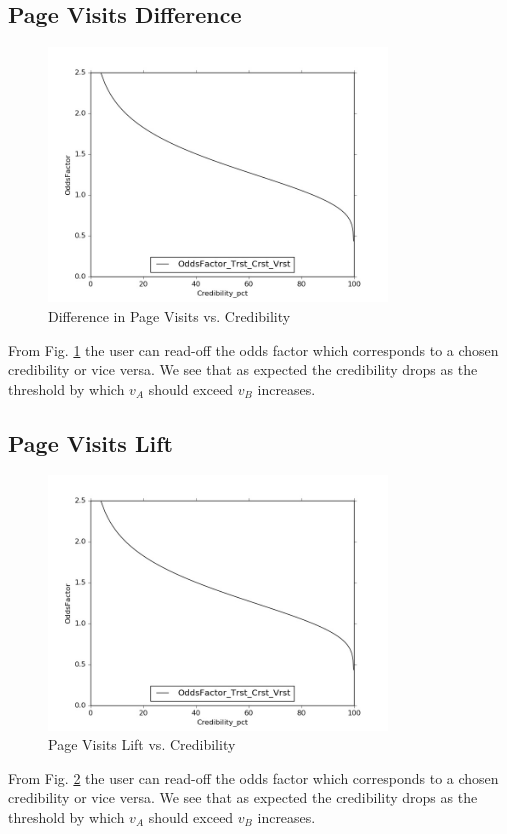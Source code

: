 \documentclass[12pt]{report}
\begin{document}
\subsection{Page Visits Difference\label{sec:visits-diff-result}}
\begin{figure}[ht!]
\centering
\includegraphics[width=90mm]{figures/OddsFactor_Trst_Crst_Vrst}
\caption{Difference in Page Visits vs. Credibility \label{fig:visitsdiff-vs-cred}}
\end{figure}
From  Fig.
\ref{fig:visitsdiff-vs-cred} the user can read-off the odds factor which
corresponds to a chosen credibility or vice versa. We see
that as expected the credibility drops as the
threshold by which \(v_A\) should exceed \(v_B\) increases.

\subsection{Page Visits Lift\label{sec:visits-lift-result}}
\begin{figure}[ht!]
\centering
\includegraphics[width=90mm]{figures/OddsFactor_Trst_Crst_Vrst}
\caption{Page Visits Lift vs. Credibility \label{fig:visitslift-vs-cred}}
\end{figure}
From  Fig.
\ref{fig:visitslift-vs-cred} the user can read-off the odds factor which
corresponds to a chosen credibility or vice versa. We see
that as expected the credibility drops as the
threshold by which \(v_A\) should exceed \(v_B\) increases.
\end{document}
